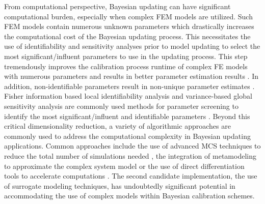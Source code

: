 From computational perspective, Bayesian updating can have significant computational burden, especially when complex FEM models are utilized. Such FEM models contain numerous unknown parameters which drastically increases the computational cost of the Bayesian updating process. This necessitates the use of identifiability and sensitivity analyses prior to model updating to select the most significant/influent parameters to use in the updating process. This step tremendously improves the calibration process runtime of complex FE models with numerous parameters and results in better parameter estimation results \citep{ramancha2021bayesianupdating}. In addition, non-identifiable parameters result in non-unique parameter estimates \citep{ramancha2020nonunique}. Fisher information based local identifiability analysis and variance-based global sensitivity analysis are commonly used methods for parameter screening to identify the most significant/influent and identifiable parameters \citep{ramancha2021bayesianupdating}. Beyond this critical dimensionality reduction, a variety of algorithmic approaches are commonly used to address the computational complexity in Bayesian updating applications. Common approaches include the use of advanced MCS techniques to reduce the total number of simulations needed \citep{quiroz2018speeding}, the integration of metamodeling to approximate the complex system model \citep{angelikopoulos2015xtmcmc, giovanis2017bayesian, wang2019reliabilitybased, zhang2019accelerating} or the use of direct differentiation tools to accelerate computations \citep{astroza2017batch}. The second candidate implementation, the use of surrogate modeling techniques, has undoubtedly significant potential in accommodating the use of complex models within Bayesian calibration schemes.     

